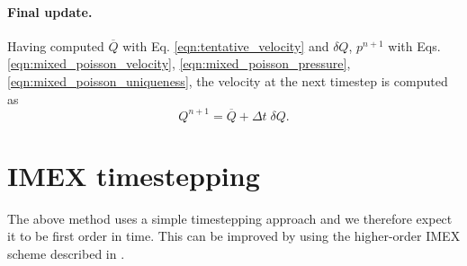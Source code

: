 \documentclass[11pt]{article}
\begin{document}
\paragraph{Final update.}
Having computed $\overline{Q}$ with Eq. \eqref{eqn:tentative_velocity} and $\delta Q$, $p^{n+1}$ with Eqs. \eqref{eqn:mixed_poisson_velocity}, \eqref{eqn:mixed_poisson_pressure}, \eqref{eqn:mixed_poisson_uniqueness}, the velocity at the next timestep is computed as
\begin{equation}
    Q^{n+1} = \overline{Q} + \Delta t\; \delta Q.
\end{equation}
\section{IMEX timestepping}
The above method uses a simple timestepping approach and we therefore expect it to be first order in time. This can be improved by using the higher-order IMEX \cite{Ascher1997} scheme described in \cite[Section 4]{Ueckermann2016}.
\end{document}
